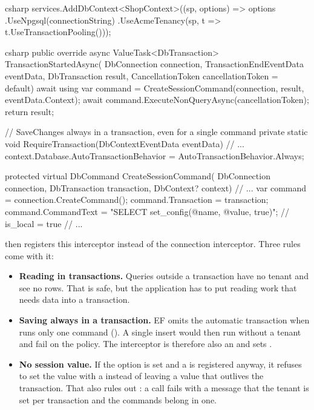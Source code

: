 \begin{sourcecode}[Application]{csharp}
services.AddDbContext<ShopContext>((sp, options) => options
    .UseNpgsql(connectionString)
    .UseAcmeTenancy(sp, t => t.UseTransactionPooling()));
\end{sourcecode}

\begin{sourcecode}{csharp}
public override async ValueTask<DbTransaction> TransactionStartedAsync(
    DbConnection connection,
    TransactionEndEventData eventData,
    DbTransaction result,
    CancellationToken cancellationToken = default)
{
    await using var command = CreateSessionCommand(connection, result, eventData.Context);
    await command.ExecuteNonQueryAsync(cancellationToken);
    return result;
}

// SaveChanges always in a transaction, even for a single command
private static void RequireTransaction(DbContextEventData eventData)
{
    // ...
        context.Database.AutoTransactionBehavior = AutoTransactionBehavior.Always;
}

protected virtual DbCommand CreateSessionCommand(
    DbConnection connection, DbTransaction transaction, DbContext? context)
{
    // ...
    var command = connection.CreateCommand();
    command.Transaction = transaction;
    command.CommandText = "SELECT set_config(@name, @value, true)";   // is_local = true
    // ...
}
\end{sourcecode}

 then registers this interceptor
instead of the connection interceptor. Three rules come with it:

\begin{itemize}
  \item \textbf{Reading in transactions.} Queries outside a transaction have no tenant and see
    no rows. That is safe, but the application has to put reading work that needs data into a
    transaction.
  \item \textbf{Saving always in a transaction.} EF omits the automatic transaction when
     runs only one command
    ().
    A single insert would then run without a tenant and fail on the policy. The interceptor is
    therefore also an  and sets
    .
  \item \textbf{No session value.} If the option is set and a
     is registered anyway, it refuses
    to set the value with a  instead of leaving a value that
    outlives the transaction. That also rules out
    : a call fails with a message that the
    tenant is set per transaction and the commands belong in one.
\end{itemize}

